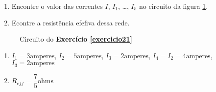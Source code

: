 \documentclass[12pt]{exam}
\begin{document}
\begin{exercicio}\label{exercicio21}
  \begin{enumerate}
    \item Encontre o valor das correntes $I$, $I_1$, \dots, $I_5$ no circuito da figura \ref{exercicio21circuitopoole}.
    \item Econtre a resistência efefiva dessa rede.
  \end{enumerate}
  \begin{figure}
    \centering
    
    \caption{Circuito do \textbf{Exercício \ref{exercicio21}}}
    \label{exercicio21circuitopoole}
  \end{figure}
  \begin{solucao}
    \begin{enumerate}
      \item $I_1 = 3 \mbox{amperes}$, $I_2 = 5 \mbox{amperes}$, $I_3 = 2 \mbox{amperes}$, $I_4 = I_2 =  4\mbox{amperes}$, $I_3 = 2 \mbox{amperes}$
      \item $R_{eff} = \dfrac{7}{5} \mbox{ohms}$
    \end{enumerate}
  \end{solucao}
\end{exercicio}
\end{document}
